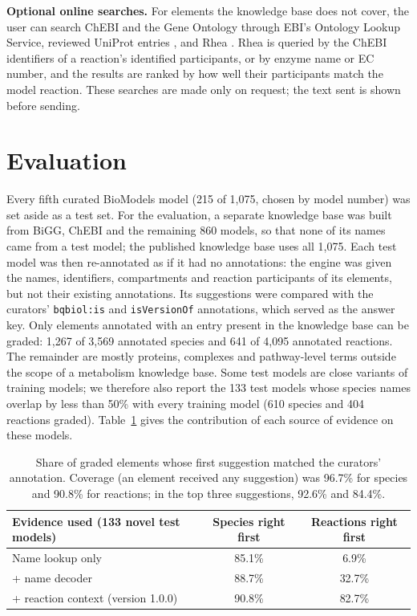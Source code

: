 \documentclass[10pt]{article}
\begin{document}
\textbf{Optional online searches.} For elements the knowledge base does not cover, the user can search
ChEBI and the Gene Ontology \cite{go2023} through EBI's Ontology Lookup Service, reviewed UniProt entries
\cite{uniprot2023}, and Rhea \cite{bansal2022rhea}. Rhea is queried by the ChEBI identifiers of a
reaction's identified participants, or by enzyme name or EC number, and the results are ranked by how well
their participants match the model reaction. These searches are made only on request; the text sent is
shown before sending.

\section{Evaluation}
Every fifth curated BioModels model (215 of 1,075, chosen by model number) was set aside as a test set. For
the evaluation, a separate knowledge base was built from BiGG, ChEBI and the remaining 860 models, so that
none of its names came from a test model; the published knowledge base uses all 1,075. Each test model was
then re-annotated as if it had no annotations: the engine was given the names, identifiers, compartments and
reaction participants of its elements, but not their existing annotations. Its suggestions were compared with
the curators' \texttt{bqbiol:is} and \texttt{isVersionOf} annotations, which served as the answer key. Only elements annotated with an entry present in
the knowledge base can be graded: 1,267 of 3,569 annotated species and 641 of 4,095 annotated reactions. The
remainder are mostly proteins, complexes and pathway-level terms outside the scope of a metabolism
knowledge base. Some test models are close variants of training models; we therefore also report the 133
test models whose species names overlap by less than 50\% with every training model (610 species and 404
reactions graded). Table~\ref{tab:results} gives the contribution of each source of evidence on these
models.

\begin{table}[h]
\centering\small
\begin{tabular}{lcc}
\toprule
Evidence used (133 novel test models) & Species right first & Reactions right first \\
\midrule
Name lookup only & 85.1\% & \phantom{0}6.9\% \\
+ name decoder & 88.7\% & 32.7\% \\
+ reaction context (version 1.0.0) & 90.8\% & 82.7\% \\
\bottomrule
\end{tabular}
\caption{Share of graded elements whose first suggestion matched the curators' annotation. Coverage (an
element received any suggestion) was 96.7\% for species and 90.8\% for reactions; in the top three
suggestions, 92.6\% and 84.4\%.}
\label{tab:results}
\end{table}
\vspace{-0.5em}
\end{document}
